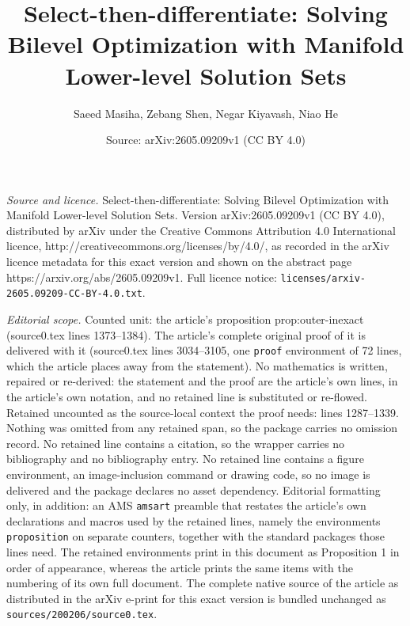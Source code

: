 \documentclass[10pt,a4paper]{amsart}
\title{Select-then-differentiate: Solving Bilevel Optimization with Manifold Lower-level Solution Sets}
\author{Saeed Masiha, Zebang Shen, Negar Kiyavash, Niao He}
\date{Source: arXiv:2605.09209v1 (CC BY 4.0)}
\begin{document}
\maketitle

\noindent\emph{Source and licence.} Select-then-differentiate: Solving Bilevel Optimization with Manifold Lower-level Solution Sets. Version arXiv:2605.09209v1 (CC BY 4.0), distributed by arXiv under the Creative Commons Attribution 4.0 International licence, http://creativecommons.org/licenses/by/4.0/, as recorded in the arXiv licence metadata for this exact version and shown on the abstract page https://arxiv.org/abs/2605.09209v1. Full licence notice: \texttt{licenses/arxiv-2605.09209-CC-BY-4.0.txt}.\par\smallskip

\noindent\textit{Editorial scope.} Counted unit: the article's proposition prop:outer-inexact (source0.tex lines 1373--1384). The article's complete original proof of it is delivered with it (source0.tex lines 3034--3105, one \texttt{proof} environment of 72 lines, which the article places away from the statement). No mathematics is written, repaired or re-derived: the statement and the proof are the article's own lines, in the article's own notation, and no retained line is substituted or re-flowed.  Retained uncounted as the source-local context the proof needs: lines 1287--1339.  Nothing was omitted from any retained span, so the package carries no omission record.  No retained line contains a citation, so the wrapper carries no bibliography and no bibliography entry.  No retained line contains a figure environment, an image-inclusion command or drawing code, so no image is delivered and the package declares no asset dependency.  Editorial formatting only, in addition: an AMS \texttt{amsart} preamble that restates the article's own declarations and macros used by the retained lines, namely the environments \texttt{proposition} on separate counters, together with the standard packages those lines need.  The retained environments print in this document as Proposition 1 in order of appearance, whereas the article prints the same items with the numbering of its own full document.  The complete native source of the article as distributed in the arXiv e-print for this exact version is bundled unchanged as \texttt{sources/200206/source0.tex}.
\end{document}
